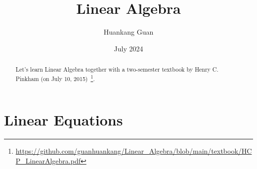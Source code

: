 \documentclass{article}
\title{Linear Algebra}
\author{Huankang Guan}
\date{July 2024}
\begin{document}
\maketitle

\begin{abstract}
    Let's learn Linear Algebra together with a two-semester textbook by Henry C. Pinkham (on July 10, 2015)~\footnote{\url{https://github.com/guanhuankang/Linear_Algebra/blob/main/textbook/HCP_LinearAlgebra.pdf}}.
\end{abstract}

\section{Linear Equations}
\end{document}
